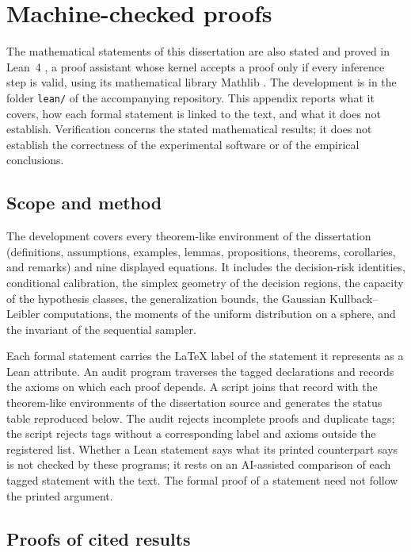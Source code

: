 \chapter{Machine-checked proofs}\label{app:formalization}

The mathematical statements of this dissertation are also stated and proved in Lean~4 \citep{demoura2021lean4}, a proof assistant whose kernel accepts a proof only if every inference step is valid, using its mathematical library Mathlib \citep{mathlib2020}. The development is in the folder \texttt{lean/} of the accompanying repository. This appendix reports what it covers, how each formal statement is linked to the text, and what it does not establish. Verification concerns the stated mathematical results; it does not establish the correctness of the experimental software or of the empirical conclusions.

\section{Scope and method}\label{sec:formalization_method}

The development covers every theorem-like environment of the dissertation (definitions, assumptions, examples, lemmas, propositions, theorems, corollaries, and remarks) and nine displayed equations. It includes the decision-risk identities, conditional calibration, the simplex geometry of the decision regions, the capacity of the hypothesis classes, the generalization bounds, the Gaussian Kullback--Leibler computations, the moments of the uniform distribution on a sphere, and the invariant of the sequential sampler.

Each formal statement carries the \LaTeX{} label of the statement it represents as a Lean attribute. An audit program traverses the tagged declarations and records the axioms on which each proof depends. A script joins that record with the theorem-like environments of the dissertation source and generates the status table reproduced below. The audit rejects incomplete proofs and duplicate tags; the script rejects tags without a corresponding label and axioms outside the registered list. Whether a Lean statement says what its printed counterpart says is not checked by these programs; it rests on an AI-assisted comparison of each tagged statement with the text. The formal proof of a statement need not follow the printed argument.

\section{Proofs of cited results}\label{sec:formalization_axioms}

